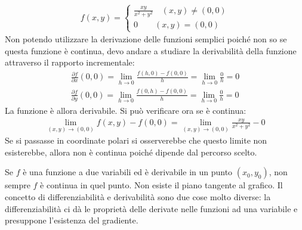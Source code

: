\documentclass[a4paper, oneside]{book}
\begin{document}
\begin{example}
    \begin{gather*}
        f(x, y) = \left\{\begin{array}{l}
            \frac{xy}{x^{2} + y^{2}  } \quad (x, y) \neq (0, 0) \\
            0 \qquad (x, y) = (0, 0)
        \end{array}\right.
    \end{gather*}
    Non potendo utilizzare la derivazione delle funzioni semplici poiché non so
    se questa funzione è continua, devo andare a studiare la derivabilità 
    della funzione attraverso il rapporto incrementale:
    \begin{gather*}
        \frac{\partial f}{\partial x}(0, 0) = \lim_{h \to 0} \frac{f(h, 0) - f(0, 0)}{h} = \lim_{h \to 0} \frac{0}{h} = 0 \\
        \frac{\partial f}{\partial y}(0, 0) = \lim_{h \to 0} \frac{f(0, h) - f(0, 0)}{h} = \lim_{h \to 0} \frac{0}{h} = 0      
    \end{gather*}
    La funzione è allora derivabile. Si può verificare ora se è continua:
    \begin{gather*}
        \lim_{(x, y) \to (0, 0)} f(x, y) - f(0, 0) =  \lim_{(x, y) \to (0, 0)} \frac{xy}{x^{2} + y^{2}} - 0 
    \end{gather*}
    Se si passasse in coordinate polari si osserverebbe che questo limite non esisterebbe,
    allora non è continua poiché dipende dal percorso scelto. 
\end{example}

\begin{observation}
    Se $f$ è una funzione a due variabili ed è derivabile in
    un punto $(x_0, y_0)$, non sempre $f$ è continua in quel punto. 
    Non esiste il piano tangente al grafico. Il concetto di differenziabilità
    e derivabilità sono due cose molto diverse: la differenziabilità ci dà 
    le proprietà delle derivate nelle funzioni ad una variabile e presuppone l'esistenza 
    del gradiente. 
\end{observation}
\end{document}
